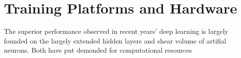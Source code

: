 \section{Training Platforms and Hardware}
The superior performance observed in recent years' deep learning is largely founded on the largely extended hidden layers and shear volume of artifial neurons. Both have put demonded for computational resources 